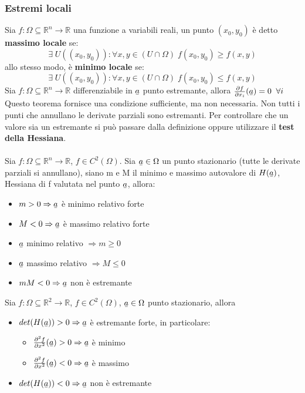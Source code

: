 \documentclass{article}
\newcommand\ubar[1]{\stackunder[1.2pt]{$#1$}{\rule{.8ex}{.075ex}}}
\newcommand{\R}{\mathds{R}}
\begin{document}
\subsubsection{Estremi locali}
Sia $f:\Omega\subseteq\R^n\rightarrow\R$ una funzione a variabili reali, un punto $(x_0,y_0)$ è detto \textbf{massimo locale} se:
$$ \exists\; U((x_0,y_0)): \forall x,y\in (U\cap \Omega)\; f(x_0,y_0)\geq f(x,y) $$
allo stesso modo, è \textbf{minimo locale} se:
$$ \exists\; U((x_0,y_0)): \forall x,y\in (U\cap \Omega)\; f(x_0,y_0)\leq f(x,y) $$
Sia $f:\Omega\subseteq\R^n\rightarrow\R$ differenziabile in $\ubar{a}$ punto estremante, allora $\frac{\partial f}{\partial x_i}(\ubar{a})=0\;\;\forall i$\\
Questo teorema fornisce una condizione sufficiente, ma non necessaria. Non tutti i punti che annullano le derivate parziali sono estremanti. Per controllare che un valore sia un estremante si può passare dalla definizione oppure utilizzare il \textbf{test della Hessiana}.\\\\
Sia $f:\Omega\subseteq\R^n\rightarrow\R$, $f\in C^2(\Omega)$. Sia $\ubar{a}\in\Omega$ un punto stazionario (tutte le derivate parziali si annullano), siano m e M il minimo e massimo autovalore di $H(\ubar{a})$, Hessiana di f valutata nel punto $\ubar{a}$, allora:
\begin{itemize}
    \item $m>0\Rightarrow\ubar{a}$ è minimo relativo forte
    \item $M<0\Rightarrow\ubar{a}$ è massimo relativo forte
    \item $\ubar{a}$ minimo relativo $\Rightarrow m\geq0$
    \item $\ubar{a}$ massimo relativo $\Rightarrow M\leq0$
    \item $mM<0\Rightarrow\ubar{a}$ non è estremante
\end{itemize}
Sia $f:\Omega\subseteq\R^2\rightarrow\R$, $f\in C^2(\Omega)$, $\ubar{a}\in\Omega$ punto stazionario, allora
\begin{itemize}
    \item $det(H(\ubar{a}))>0\Rightarrow\ubar{a}$ è estremante forte, in particolare:
    \begin{itemize}
        \item $\frac{\partial^2f}{\partial x^2}(\ubar{a})>0\Rightarrow\ubar{a}$ è minimo
        \item $\frac{\partial^2f}{\partial x^2}(\ubar{a})<0\Rightarrow\ubar{a}$ è massimo
    \end{itemize}
    
    \item $det(H(\ubar{a}))<0\Rightarrow\ubar{a}$ non è estremante
\end{itemize}
\end{document}
